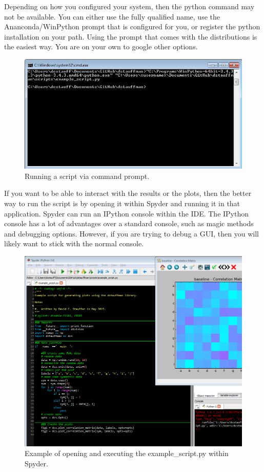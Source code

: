 \documentclass[12pt]{article}
\begin{document}
Depending on how you configured your system, then the python command may not be available.  You can either use the fully qualified name, use the Ananconda/WinPython prompt that is configured for you, or register the python installation on your path.  Using the prompt that comes with the distributions is the easiest way.  You are on your own to google other options.

\begin{figure}[H]
    \centering
    \includegraphics[width=\textwidth]{Running_Code_via_cmd.png}
    \caption{Running a script via command prompt.}
    \label{fig:running_via_cmd}
\end{figure}

If you want to be able to interact with the results or the plots, then the better way to run the script is by opening it within Spyder and running it in that application.  Spyder can run an IPython console within the IDE.  The IPython console has a lot of advantages over a standard console, such as magic methods and debugging options.  However, if you are trying to debug a GUI, then you will likely want to stick with the normal console.

\begin{figure}[H]
    \centering
    \includegraphics[width=\textwidth]{Spyder_IDE_screenshot.png}
    \caption{Example of opening and executing the example\_script.py within Spyder.}
    \label{fig:spyder_example}
\end{figure}
\end{document}
